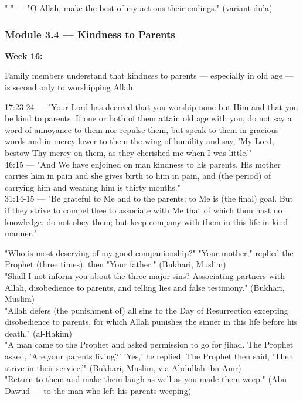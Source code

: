 \documentclass[11pt,a4paper]{article}
\begin{document}
\begin{duabox} "    " --- "O Allah, make the best of my actions their endings." (variant du'a) \end{duabox}

\vspace{6pt}\noindent{\color{border}\rule{\textwidth}{0.5pt}}\vspace{6pt}

\subsubsection*{Module 3.4 --- Kindness to Parents}
\textbf{Week 16:} 

\begin{outcomebox} Family members understand that kindness to parents --- especially in old age --- is second only to worshipping Allah. \end{outcomebox}

\begin{quranbox} 17:23-24 --- "Your Lord has decreed that you worship none but Him and that you be kind to parents. If one or both of them attain old age with you, do not say a word of annoyance to them nor repulse them, but speak to them in gracious words and in mercy lower to them the wing of humility and say, 'My Lord, bestow Thy mercy on them, as they cherished me when I was little.'" \\ 46:15 --- "And We have enjoined on man kindness to his parents. His mother carries him in pain and she gives birth to him in pain, and (the period) of carrying him and weaning him is thirty months." \\ 31:14-15 --- "Be grateful to Me and to the parents; to Me is (the final) goal. But if they strive to compel thee to associate with Me that of which thou hast no knowledge, do not obey them; but keep company with them in this life in kind manner." \end{quranbox}

\begin{hadithbox} "Who is most deserving of my good companionship?" "Your mother," replied the Prophet (three times), then "Your father." (Bukhari, Muslim) \\ "Shall I not inform you about the three major sins? Associating partners with Allah, disobedience to parents, and telling lies and false testimony." (Bukhari, Muslim) \\ "Allah defers (the punishment of) all sins to the Day of Resurrection excepting disobedience to parents, for which Allah punishes the sinner in this life before his death." (al-Hakim) \\ "A man came to the Prophet and asked permission to go for jihad. The Prophet asked, 'Are your parents living?' 'Yes,' he replied. The Prophet then said, 'Then strive in their service.'" (Bukhari, Muslim, via Abdullah ibn Amr) \\ "Return to them and make them laugh as well as you made them weep." (Abu Dawud --- to the man who left his parents weeping) \end{hadithbox}
\end{document}

